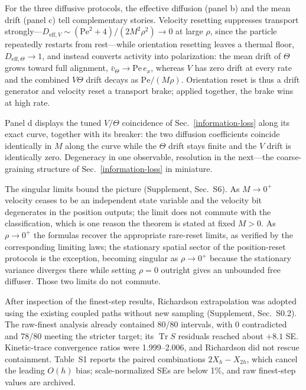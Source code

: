 For the three diffusive protocols, the effective diffusion (panel b) and the mean drift (panel c) tell complementary stories. Velocity resetting suppresses transport strongly---$D_{\mathrm{eff},V}\sim(\mathrm{Pe}^2+4)/(2M^2\rho^2)\to0$ at large $\rho$, since the particle repeatedly restarts from rest---while orientation resetting leaves a thermal floor, $D_{\mathrm{eff},\Theta}\to1$, and instead converts activity into polarization: the mean drift of $\Theta$ grows toward full alignment, $\bar v_\Theta\to\mathrm{Pe}\,e_x$, whereas $V$ has zero drift at every rate and the combined $V\Theta$ drift decays as $\mathrm{Pe}/(M\rho)$. Orientation reset is thus a drift generator and velocity reset a transport brake; applied together, the brake wins at high rate.

Panel d displays the tuned $V/\Theta$ coincidence of Sec.~\ref{information-loss} along its exact curve, together with its breaker: the two diffusion coefficients coincide identically in $M$ along the curve while the $\Theta$ drift stays finite and the $V$ drift is identically zero. Degeneracy in one observable, resolution in the next---the coarse-graining structure of Sec.~\ref{information-loss} in miniature.

The singular limits bound the picture (Supplement, Sec.~S6). As $M\to0^+$ velocity ceases to be an independent state variable and the velocity bit degenerates in the position outputs; the limit does not commute with the classification, which is one reason the theorem is stated at fixed $M>0$. As $\rho\to0^+$ the formulas recover the appropriate rare-reset limits, as verified by the corresponding limiting laws; the stationary spatial sector of the position-reset protocols is the exception, becoming singular as $\rho\to0^+$ because the stationary variance diverges there while setting $\rho=0$ outright gives an unbounded free diffuser. Those two limits do not commute.

\begin{samepage}
After inspection of the finest-step results, Richardson extrapolation was adopted using the existing coupled paths without new sampling (Supplement, Sec.~S0.2). The raw-finest analysis already contained 80/80 intervals, with 0 contradicted and 78/80 meeting the stricter target; its $\operatorname{Tr}S$ residuals reached about $+8.1$ SE. Kinetic-trace convergence ratios were 1.999--2.006, and Richardson did not rescue containment. Table~S1 reports the paired combinations $2X_h-X_{2h}$, which cancel the leading $O(h)$ bias; scale-normalized SEs are below 1\%, and raw finest-step values are archived.
\par\end{samepage}

